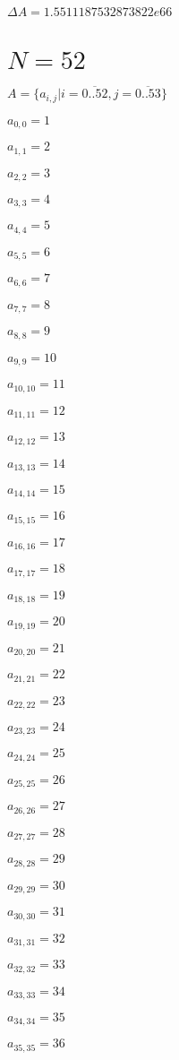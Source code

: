 \documentclass[a4paper,12pt]{article}
\begin{document}
$\Delta A = 1.5511187532873822e66$



\section{ $N = 52$ }
$A = \{ a _{ i, j } | i = \overline { 0..52 }, j = \overline { 0..53 } \}$

$a _{ 0, 0 } = 1$

$a _{ 1, 1 } = 2$

$a _{ 2, 2 } = 3$

$a _{ 3, 3 } = 4$

$a _{ 4, 4 } = 5$

$a _{ 5, 5 } = 6$

$a _{ 6, 6 } = 7$

$a _{ 7, 7 } = 8$

$a _{ 8, 8 } = 9$

$a _{ 9, 9 } = 10$

$a _{ 10, 10 } = 11$

$a _{ 11, 11 } = 12$

$a _{ 12, 12 } = 13$

$a _{ 13, 13 } = 14$

$a _{ 14, 14 } = 15$

$a _{ 15, 15 } = 16$

$a _{ 16, 16 } = 17$

$a _{ 17, 17 } = 18$

$a _{ 18, 18 } = 19$

$a _{ 19, 19 } = 20$

$a _{ 20, 20 } = 21$

$a _{ 21, 21 } = 22$

$a _{ 22, 22 } = 23$

$a _{ 23, 23 } = 24$

$a _{ 24, 24 } = 25$

$a _{ 25, 25 } = 26$

$a _{ 26, 26 } = 27$

$a _{ 27, 27 } = 28$

$a _{ 28, 28 } = 29$

$a _{ 29, 29 } = 30$

$a _{ 30, 30 } = 31$

$a _{ 31, 31 } = 32$

$a _{ 32, 32 } = 33$

$a _{ 33, 33 } = 34$

$a _{ 34, 34 } = 35$

$a _{ 35, 35 } = 36$
\end{document}
